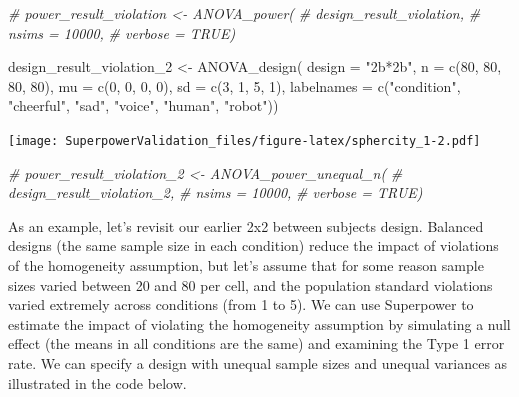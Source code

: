 \documentclass[
]{book}
\newenvironment{Shaded}{\begin{snugshade}}{\end{snugshade}}
\newcommand{\AttributeTok}[1]{\textcolor[rgb]{0.77,0.63,0.00}{#1}}
\newcommand{\CommentTok}[1]{\textcolor[rgb]{0.56,0.35,0.01}{\textit{#1}}}
\newcommand{\DecValTok}[1]{\textcolor[rgb]{0.00,0.00,0.81}{#1}}
\newcommand{\FunctionTok}[1]{\textcolor[rgb]{0.00,0.00,0.00}{#1}}
\newcommand{\NormalTok}[1]{#1}
\newcommand{\OtherTok}[1]{\textcolor[rgb]{0.56,0.35,0.01}{#1}}
\newcommand{\StringTok}[1]{\textcolor[rgb]{0.31,0.60,0.02}{#1}}
\begin{document}
\begin{Shaded}
\begin{Highlighting}[]
\CommentTok{\# power\_result\_violation \textless{}{-} ANOVA\_power(}
\CommentTok{\#    design\_result\_violation,}
\CommentTok{\#    nsims = 10000,}
\CommentTok{\#    verbose = TRUE)}

\NormalTok{design\_result\_violation\_2 }\OtherTok{\textless{}{-}} \FunctionTok{ANOVA\_design}\NormalTok{(}
  \AttributeTok{design =} \StringTok{"2b*2b"}\NormalTok{,}
  \AttributeTok{n =} \FunctionTok{c}\NormalTok{(}\DecValTok{80}\NormalTok{, }\DecValTok{80}\NormalTok{, }\DecValTok{80}\NormalTok{, }\DecValTok{80}\NormalTok{),}
  \AttributeTok{mu =} \FunctionTok{c}\NormalTok{(}\DecValTok{0}\NormalTok{, }\DecValTok{0}\NormalTok{, }\DecValTok{0}\NormalTok{, }\DecValTok{0}\NormalTok{),}
  \AttributeTok{sd =} \FunctionTok{c}\NormalTok{(}\DecValTok{3}\NormalTok{, }\DecValTok{1}\NormalTok{, }\DecValTok{5}\NormalTok{, }\DecValTok{1}\NormalTok{),}
  \AttributeTok{labelnames =} \FunctionTok{c}\NormalTok{(}\StringTok{"condition"}\NormalTok{, }\StringTok{"cheerful"}\NormalTok{, }\StringTok{"sad"}\NormalTok{, }\StringTok{"voice"}\NormalTok{, }\StringTok{"human"}\NormalTok{, }\StringTok{"robot"}\NormalTok{))}
\end{Highlighting}
\end{Shaded}

\texttt{[image: SuperpowerValidation\_files/figure-latex/sphercity\_1-2.pdf]}

\begin{Shaded}
\begin{Highlighting}[]
\CommentTok{\# power\_result\_violation\_2 \textless{}{-} ANOVA\_power\_unequal\_n(}
\CommentTok{\#    design\_result\_violation\_2,}
\CommentTok{\#    nsims = 10000,}
\CommentTok{\#    verbose = TRUE)}
\end{Highlighting}
\end{Shaded}

As an example, let's revisit our earlier 2x2 between subjects design.
Balanced designs (the same sample size in each condition) reduce the impact of violations of the homogeneity assumption, but let's assume that for some reason sample sizes varied between 20 and 80 per cell, and the population standard violations varied extremely across conditions (from 1 to 5).
We can use Superpower to estimate the impact of violating the homogeneity assumption by simulating a null effect (the means in all conditions are the same) and examining the Type 1 error rate.
We can specify a design with unequal sample sizes and unequal variances as illustrated in the code below.
\end{document}
